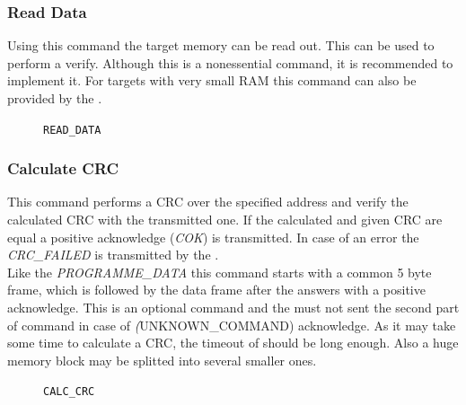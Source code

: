 \pagebreak[4]
\subsubsection{Read Data}
\label{sec:ReadData}
Using this command the target memory can be read out. This can be used to perform a verify. Although this is a nonessential command, it is recommended to implement it. For targets with very small RAM this command can also be provided by the \bro{}.\\

\begin{figure}[h]
\begin{center}
\caption{\texttt{READ_DATA}}
\label{fig:CmdReadData}
\end{center}
\end{figure}

\pagebreak[3]
\subsubsection{Calculate CRC}
\label{sec:CalcCRC}
This command performs a CRC over the specified address and verify the calculated CRC with the transmitted one. If the calculated and given CRC are equal a positive acknowledge (\emph{COK}) is transmitted. In case of an error the \emph{CRC_FAILED} is transmitted by the \bl{}.\\
Like the \emph{PROGRAMME_DATA} this command starts with a common 5 byte frame, which is followed by the data frame after the \bl{} answers with a positive acknowledge. This is an optional command and the \fp{} must not sent the second part of command in case of \emph(UNKNOWN_COMMAND) acknowledge.
As it may take some time to calculate a CRC, the timeout of \fp{} should be long enough. Also a huge memory block may be splitted into several smaller ones.\\
 
\begin{figure}[h]
\begin{center}


\caption{\texttt{CALC_CRC}}
\label{fig:CmdCalcCrc}
\end{center}
\end{figure}

